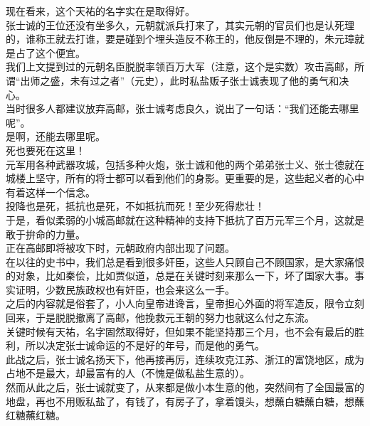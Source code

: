\begin{multicols}{\theparacolNo}
现在看来，这个天祐的名字实在是取得好。\\

张士诚的王位还没有坐多久，元朝就派兵打来了，其实元朝的官员们也是认死理的，谁称王就去打谁，要是碰到个埋头造反不称王的，他反倒是不理的，朱元璋就是占了这个便宜。\\

我们上文提到过的元朝名臣脱脱率领百万大军（注意，这个是实数）攻击高邮，所谓“出师之盛，未有过之者”（元史），此时私盐贩子张士诚表现了他的勇气和决心。\\

当时很多人都建议放弃高邮，张士诚考虑良久，说出了一句话：“我们还能去哪里呢”。\\

是啊，还能去哪里呢。\\

死也要死在这里！\\

元军用各种武器攻城，包括多种火炮，张士诚和他的两个弟弟张士义、张士德就在城楼上坚守，所有的将士都可以看到他们的身影。更重要的是，这些起义者的心中有着这样一个信念。\\

投降也是死，抵抗也是死，不如抵抗而死！至少死得悲壮！\\

于是，看似柔弱的小城高邮就在这种精神的支持下抵抗了百万元军三个月，这就是敢于拚命的力量。\\

正在高邮即将被攻下时，元朝政府内部出现了问题。\\

在以往的史书中，我们总是看到很多奸臣，这些人只顾自己不顾国家，是大家痛恨的对象，比如秦侩，比如贾似道，总是在关键时刻来那么一下，坏了国家大事。事实证明，少数民族政权也有奸臣，也会来这么一手。\\

之后的内容就是俗套了，小人向皇帝进谗言，皇帝担心外面的将军造反，限令立刻回来，于是脱脱撤离了高邮，他挽救元王朝的努力也就这么付之东流。\\

关键时候有天祐，名字固然取得好，但如果不能坚持那三个月，也不会有最后的胜利，所以决定张士诚命运的不是好的年号，而是他的勇气。\\

此战之后，张士诚名扬天下，他再接再厉，连续攻克江苏、浙江的富饶地区，成为占地不是最大，却最富有的人（不愧是做私盐生意的）。\\

然而从此之后，张士诚就变了，从来都是做小本生意的他，突然间有了全国最富的地盘，再也不用贩私盐了，有钱了，有房子了，拿着馒头，想蘸白糖蘸白糖，想蘸红糖蘸红糖。\\


\end{multicols}
